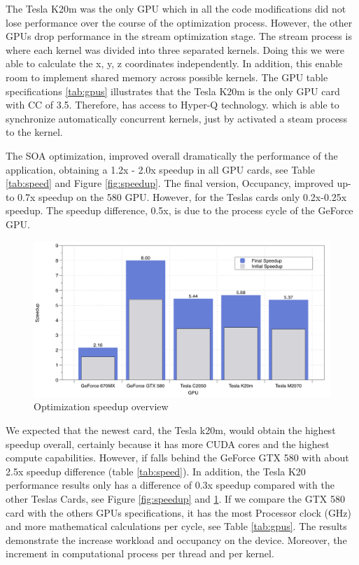 The Tesla K20m was the only GPU which in all the code modifications did not lose performance over the course of the optimization process. However, the other GPUs drop performance in the stream optimization stage. The stream process is where each kernel was divided into three separated kernels. Doing this we were able to calculate the x, y, z coordinates independently. In addition, this enable room to implement shared memory across possible kernels. The GPU table specifications \ref{tab:gpus} illustrates that the Tesla K20m is the only GPU card with CC of 3.5. Therefore, has access to Hyper-Q technology. which is able to synchronize automatically concurrent kernels, just by activated a steam process to the kernel.

The SOA optimization, improved overall dramatically the performance of the application, obtaining a 1.2x - 2.0x speedup in all GPU cards, see Table \ref{tab:speed} and Figure \ref{fig:speedup}. The final version, Occupancy, improved up-to 0.7x speedup on the 580 GPU. However, for the Teslas cards only 0.2x-0.25x speedup. The speedup difference, 0.5x,  is due to the process cycle of the GeForce GPU. 

\begin{figure}[htbp]
	\centering
		\includegraphics[width=1.0\textwidth]{Figures/speed.png}
		\smallskip
	\caption[Optimization speedup overview]{Optimization speedup overview}
	\label{fig:speeduplast}
\end{figure}


We expected that the newest card, the Tesla k20m, would obtain the highest speedup overall, certainly because it has more CUDA cores and the highest compute capabilities. However, if falls behind the GeForce GTX 580 with about 2.5x speedup difference (table \ref{tab:speed}). In addition, the Tesla K20 performance results only has a difference of 0.3x speedup compared with the other Teslas Cards, see Figure \ref{fig:speedup} and \ref{fig:speeduplast}. If we compare the GTX 580 card with the others GPUs specifications, it has the most Processor clock (GHz) and more mathematical calculations per cycle, see Table \ref{tab:gpus}. The results demonstrate the increase workload and occupancy on the device. Moreover, the increment in computational process per thread and per kernel.


